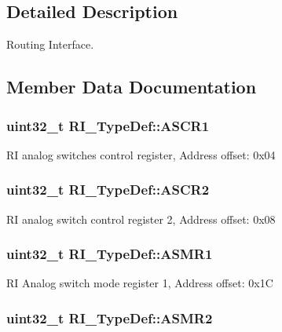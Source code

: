 \subsection{Detailed Description}
Routing Interface. 

\subsection{Member Data Documentation}
\hypertarget{struct_r_i___type_def_a0e22b5b4cb660a876e185c9c2225f45f}{
\subsubsection[{A\-S\-C\-R1}]{ uint32\-\_\-t R\-I\-\_\-\-Type\-Def\-::\-A\-S\-C\-R1}}\label{struct_r_i___type_def_a0e22b5b4cb660a876e185c9c2225f45f}
R\-I analog switches control register, Address offset\-: 0x04 \hypertarget{struct_r_i___type_def_aeef72e9f5e1d864dde15d636219ac58d}{
\subsubsection[{A\-S\-C\-R2}]{ uint32\-\_\-t R\-I\-\_\-\-Type\-Def\-::\-A\-S\-C\-R2}}\label{struct_r_i___type_def_aeef72e9f5e1d864dde15d636219ac58d}
R\-I analog switch control register 2, Address offset\-: 0x08 \hypertarget{struct_r_i___type_def_a4063fdb02d5f7c244eebacfb5ece688b}{
\subsubsection[{A\-S\-M\-R1}]{ uint32\-\_\-t R\-I\-\_\-\-Type\-Def\-::\-A\-S\-M\-R1}}\label{struct_r_i___type_def_a4063fdb02d5f7c244eebacfb5ece688b}
R\-I Analog switch mode register 1, Address offset\-: 0x1\-C \hypertarget{struct_r_i___type_def_a84ae96e8e67a2e25231c369ec3ce64fd}{
\subsubsection[{A\-S\-M\-R2}]{ uint32\-\_\-t R\-I\-\_\-\-Type\-Def\-::\-A\-S\-M\-R2}}\label{struct_r_i___type_def_a84ae96e8e67a2e25231c369ec3ce64fd}
